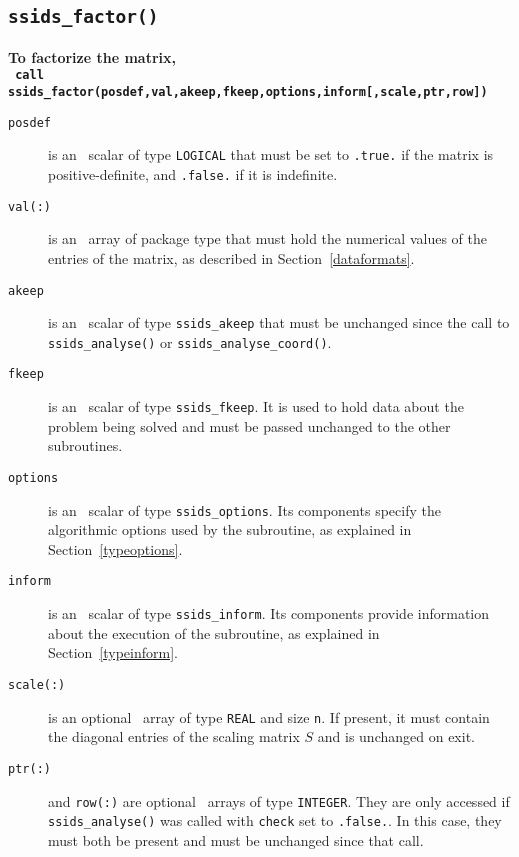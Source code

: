 \documentclass{spral}
\begin{document}
\subsection{\texttt{ssids\_factor()}} \label{factorize}
\textbf{To factorize the matrix,
   \vspace*{0.1cm} \\
   \texttt{ \hspace*{0.2cm}
      call ssids\_factor(posdef,val,akeep,fkeep,options,inform[,scale,ptr,row])
   }
}

\begin{description}
\item[\texttt{posdef}] is an \intentin\ scalar of type {\tt LOGICAL} that
must be set to {\tt .true.} if the matrix is positive-definite, and
{\tt .false.} if it is indefinite.

\item[\texttt{val(:)}] is an \intentin\ array of package type that must hold
the numerical values of the entries of the matrix, as described in
Section~\ref{dataformats}.

\item[\texttt{akeep}]  is an \intentin\ scalar of type
{\tt ssids\_akeep} that must be unchanged since the
call to {\tt ssids\_analyse()} or {\tt ssids\_analyse\_coord()}.

\item[\texttt{fkeep}]  is an \intentinout\ scalar of type
{\tt ssids\_fkeep}. It is used to hold data about the problem being
solved and must be passed unchanged to the other subroutines.

\item[\texttt{options}] is an \intentin\ scalar of type {\tt ssids\_options}.
Its components specify the algorithmic options used by the subroutine, as
explained in Section~\ref{typeoptions}.

\item[\texttt{inform}] is an \intentout\ scalar of type
{\tt ssids\_inform}. Its components provide information about the execution
of the subroutine, as explained in Section~\ref{typeinform}.

\item[\texttt{scale(:)}] is an optional \intentinout\ array of type {\tt REAL}
and size {\tt n}. If present, it must contain  the diagonal
entries of the scaling matrix ${S}$ and is unchanged on exit.

\item[\texttt{ptr(:)}] and {\tt row(:)} are optional \intentin\ arrays of
type {\tt INTEGER}. They are only accessed if {\tt ssids\_analyse()} was called
with {\tt check} set to {\tt .false.}.
In this case, they must both be present and  must be unchanged since that call.

\end{description}
\end{document}
